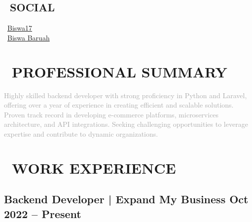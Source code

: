 \documentclass[10pt,a4paper]{article}
\begin{document}
\begin{paracol}{2}
\begin{leftcolumn}
\vspace{2mm}
\section*{\faGlobe\ SOCIAL}
\footnotesize
\textcolor{darkgray}{
\faGithub\ \href{https://github.com/Biswa17}{Biswa17} \\[1mm]
\faLinkedin\ \href{https://linkedin.com/in/biswa-baruah}{Biswa Baruah}
}

\end{leftcolumn}

\begin{rightcolumn}

\section*{\faBriefcase\ PROFESSIONAL SUMMARY}
\small
\textcolor{darkgray}{
Highly skilled backend developer with strong proficiency in Python and Laravel, offering over a year of experience in creating efficient and scalable solutions. Proven track record in developing e-commerce platforms, microservices architecture, and API integrations. Seeking challenging opportunities to leverage expertise and contribute to dynamic organizations.
}

\vspace{2mm}
\section*{\faBuilding\ WORK EXPERIENCE}

\subsection*{Backend Developer | Expand My Business \hfill \textcolor{primaryblue}{Oct 2022 – Present}}


\end{rightcolumn}
\end{paracol}
\end{document}
